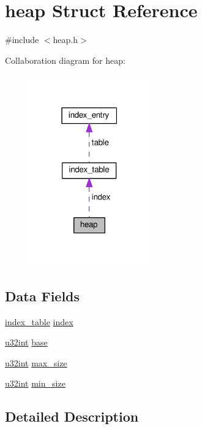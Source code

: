 \hypertarget{structheap}{}\section{heap Struct Reference}
\label{structheap}


{\ttfamily \#include $<$heap.\+h$>$}



Collaboration diagram for heap\+:\nopagebreak
\begin{figure}[H]
\begin{center}
\leavevmode
\includegraphics[width=147pt]{structheap__coll__graph}
\end{center}
\end{figure}
\subsection*{Data Fields}
\begin{DoxyCompactItemize}
\item 
\hyperlink{structindex__table}{index\+\_\+table} \hyperlink{structheap_a8fe6ce2a8b45088990071e9b1d35add2}{index}
\item 
\hyperlink{system_8h_a757de76cafbcddaac0d1632902fe4cb8}{u32int} \hyperlink{structheap_a744634662f1ffdb4d85632e68c063e51}{base}
\item 
\hyperlink{system_8h_a757de76cafbcddaac0d1632902fe4cb8}{u32int} \hyperlink{structheap_ad2e0262828735d6e437facbfce37d6b0}{max\+\_\+size}
\item 
\hyperlink{system_8h_a757de76cafbcddaac0d1632902fe4cb8}{u32int} \hyperlink{structheap_a7b4422774c5ca7ac8ed5ddfe95f5c8ec}{min\+\_\+size}
\end{DoxyCompactItemize}


\subsection{Detailed Description}


